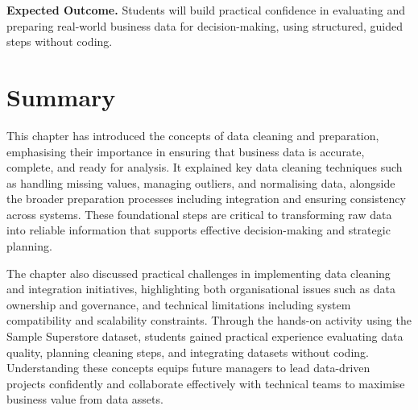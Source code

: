 \textbf{Expected Outcome.}  
Students will build practical confidence in evaluating and preparing real-world business data for decision-making, using structured, guided steps without coding.


\section{Summary}

This chapter has introduced the concepts of data cleaning and preparation, emphasising their importance in ensuring that business data is accurate, complete, and ready for analysis. It explained key data cleaning techniques such as handling missing values, managing outliers, and normalising data, alongside the broader preparation processes including integration and ensuring consistency across systems. These foundational steps are critical to transforming raw data into reliable information that supports effective decision-making and strategic planning.

The chapter also discussed practical challenges in implementing data cleaning and integration initiatives, highlighting both organisational issues such as data ownership and governance, and technical limitations including system compatibility and scalability constraints. Through the hands-on activity using the Sample Superstore dataset, students gained practical experience evaluating data quality, planning cleaning steps, and integrating datasets without coding. Understanding these concepts equips future managers to lead data-driven projects confidently and collaborate effectively with technical teams to maximise business value from data assets.

